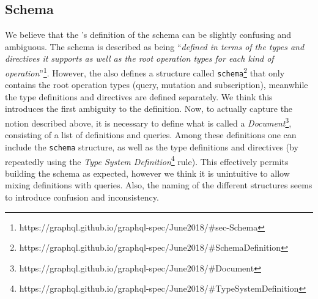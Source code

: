 \subsection{\gql Schema}

We believe that the \spec's definition of the schema can be slightly confusing and ambiguous. The schema is described as being ``\textit{defined in terms of the types and directives it supports as well as the root operation types for each kind of operation}''\footnote{https://graphql.github.io/graphql-spec/June2018/\#sec-Schema}. However, the \spec also defines a structure called \texttt{schema}\footnote{https://graphql.github.io/graphql-spec/June2018/\#SchemaDefinition} that only contains the root operation types (query, mutation and subscription), meanwhile the type definitions and directives are defined separately. We think this introduces the first ambiguity to the definition. Now, to actually capture the notion described above, it is necessary to define what is called a \textit{Document}\footnote{https://graphql.github.io/graphql-spec/June2018/\#Document}, consisting of a list of definitions and queries. Among these definitions one can include the \texttt{schema} structure, as well as the type definitions and directives (by repeatedly using the \textit{Type System Definition}\footnote{https://graphql.github.io/graphql-spec/June2018/\#TypeSystemDefinition} rule). This effectively permits building the schema as expected, however we think it is unintuitive to allow mixing definitions with queries. Also, the naming of the different structures seems to introduce confusion and inconsistency.

 




